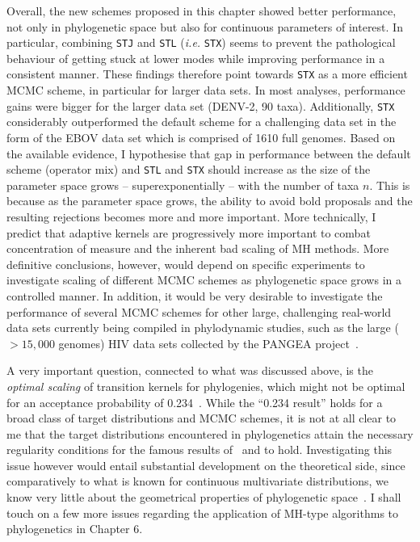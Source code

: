 Overall, the new schemes proposed in this chapter showed better performance, not only in phylogenetic space but also for continuous parameters of interest.
In particular, combining \verb|STJ| and \verb|STL| (\textit{i.e.} \verb|STX|) seems to prevent the pathological behaviour of getting stuck at lower modes while improving performance in a consistent manner.
These findings therefore point towards \verb|STX| as a more efficient MCMC scheme, in particular for larger data sets.
In most analyses, performance gains were bigger for the larger data set (DENV-2, 90 taxa).
Additionally, \verb|STX| considerably outperformed the default scheme for a challenging data set in the form of the EBOV data set which is comprised of 1610 full genomes.
Based on the available evidence, I hypothesise that gap in performance between the default scheme (operator mix) and \verb|STL| and \verb|STX| should increase as the size of the parameter space grows -- superexponentially -- with the number of taxa $n$.
This is because as the parameter space grows, the ability to avoid bold proposals and the resulting rejections becomes more and more important.
More technically, I predict that adaptive kernels are progressively more important to combat concentration of measure and the inherent bad scaling of MH methods.
More definitive conclusions, however, would depend on specific experiments to investigate scaling of different MCMC schemes as phylogenetic space grows in a controlled manner.
In addition, it would be very desirable to investigate the performance of several MCMC schemes for other large, challenging real-world data sets currently being compiled in phylodynamic studies, such as the large ($>15, 000$ genomes) HIV data sets collected by the PANGEA project~\citep{Pillay2015}.

A very important question, connected to what was discussed above, is the \textit{optimal scaling} of transition kernels for phylogenies, which might not be optimal for an acceptance probability of 0.234~\citep{Potter2015}.
While the ``0.234 result'' holds for a broad class of target distributions and MCMC schemes, it is not at all clear to me that the target distributions encountered in phylogenetics attain the necessary regularity conditions for the famous results of~\cite{Gelman1996} and \cite{Roberts1998} to hold.
Investigating this issue however would entail substantial development on the theoretical side, since comparatively to what is known for continuous multivariate distributions, we know very little about the geometrical properties of phylogenetic space~\citep{Gavryushkin2016, StJohn2017,Whidden2017}.
I shall touch on a few more issues regarding the application of MH-type algorithms to phylogenetics in Chapter 6.

